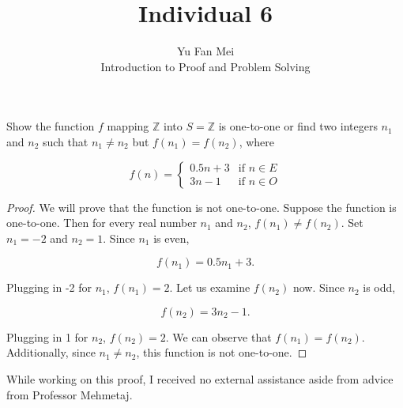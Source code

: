 \documentclass[12pt]{article}
\newenvironment{problem}[2][Problem]{\begin{trivlist}
\item[\hskip \labelsep {\bfseries #1}\hskip \labelsep {\bfseries #2.}]}{\end{trivlist}}
\begin{document}

\title{Individual 6}%
\author{Yu Fan Mei\\ %
	Introduction to Proof and Problem Solving} %

\maketitle

\begin{problem}{12} %
    Show the function $f$ mapping $\mathbb{Z}$ into $S = \mathbb{Z} $ is one-to-one or find two integers $n_1$ and $n_2$ such that $n_1 \neq n_2$ but $f(n_1) = f(n_2)$, where

    $$f(n) = 
        \begin{cases} 
        0.5n + 3 & \text{if } n \in E \\ 
        3n - 1 & \text{if } n \in O 
        \end{cases}$$


    
    

\end{problem}

\begin{proof} We will prove that the function is not one-to-one. Suppose the function is one-to-one. Then for every real number $n_1$ and $n_2$, $f(n_1) \neq f(n_2)$. Set $n_1 = -2$ and $n_2 = 1$. Since $n_1$ is even, 

        $$f(n_1) = 0.5n_1 + 3.$$
    
    Plugging in -2 for $n_1$, $f(n_1) = 2$. Let us examine $f(n_2)$ now. Since $n_2$ is odd,


        $$f(n_2) = 3n_2 - 1.$$
    
    Plugging in 1 for $n_2$, $f(n_2) = 2$. We can observe that $f(n_1) = f(n_2)$. Additionally, since $n_1 \neq n_2$, this function is not one-to-one.


\end{proof}


\noindent While working on this proof, I received no external assistance aside from advice from Professor Mehmetaj.
\end{document}
